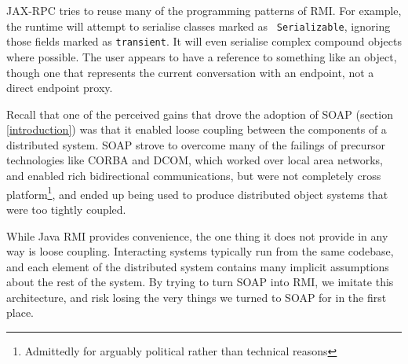 JAX-RPC tries to reuse many of the programming patterns of RMI. For
example, the runtime will attempt to serialise classes marked as {\tt
Serializable}, ignoring those fields marked as {\tt transient}. It
will even serialise complex compound objects where possible. The user
appears to have a reference to something like an object, though one
that represents the current conversation with an endpoint, not a
direct endpoint proxy.

Recall that one of the perceived gains that drove the adoption of SOAP
(section \ref{introduction}) was that it enabled loose coupling
between the components of a distributed system. SOAP strove to
overcome many of the failings of precursor technologies like CORBA and
DCOM, which worked over local area networks, and enabled
rich bidirectional communications, but were not completely cross
platform\footnote{Admittedly for arguably political rather than
technical reasons}, and ended up being used to produce distributed
object systems that were too tightly coupled.

While Java RMI provides convenience, the one thing it does not provide
in any way is loose coupling. Interacting systems typically run from
the same codebase, and each element of the distributed system contains
many implicit assumptions about the rest of the system. By trying to
turn SOAP into RMI, we imitate this architecture, and risk losing the
very things we turned to SOAP for in the first place.




